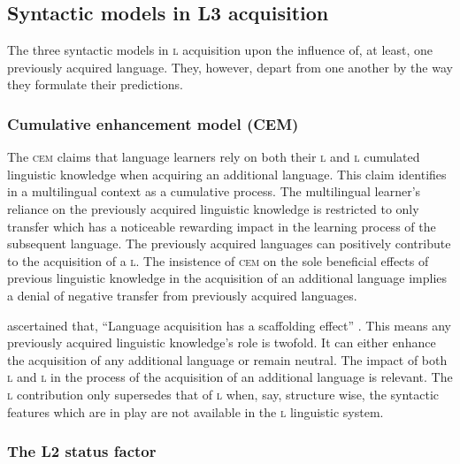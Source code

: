 \documentclass[output=paper,
modfonts
]{langscibook}
\begin{document}
\subsection{Syntactic models in L3 acquisition}

The three syntactic models in \textsc{l} acquisition  upon the influence of, at least, one previously acquired language. They, however, depart from one another by the way they formulate their predictions.

\subsubsection{Cumulative enhancement model (CEM)}

The \textsc{cem} \citep{FlynnEtAl2004} claims that language learners rely on both their \textsc{l} and \textsc{l} cumulated linguistic knowledge when acquiring an additional language. This claim identifies  in a multilingual context as a cumulative process. The multilingual learner’s reliance on the previously acquired linguistic knowledge is restricted to only transfer which has a noticeable rewarding impact in the learning process of the subsequent language. The previously acquired languages can positively contribute to the acquisition of a \textsc{l}. The insistence of \textsc{cem} on the sole beneficial effects of previous linguistic knowledge in the acquisition of an additional language implies a denial of negative transfer from previously acquired languages. 

\citet{FlynnEtAl2004} ascertained that, “Language acquisition has a scaffolding effect” \citep[110]{Rothman2010}. This means any previously acquired linguistic knowledge’s role is twofold. It can either enhance the acquisition of any additional language or remain neutral. The impact of both \textsc{l} and \textsc{l} in the process of the acquisition of an additional language is relevant. The \textsc{l} contribution only supersedes that of \textsc{l} when, say, structure wise, the syntactic features which are in play are not available in the \textsc{l} linguistic system.

\subsubsection{The L2 status factor}
\end{document}
